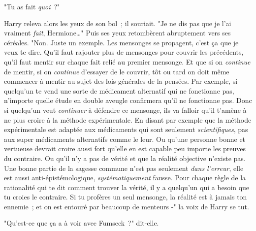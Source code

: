 "Tu as fait \emph{quoi}~?"

Harry releva alors les yeux de son bol~; il souriait. "Je ne dis pas que je l'ai vraiment \emph{fait}, Hermione…" Puis ses yeux retombèrent abruptement vers ses céréales. "Non. Juste un exemple. Les mensonges se propagent, c'est ça que je veux te dire. Qu'il faut rajouter plus de mensonges pour couvrir les précédents, qu'il faut mentir sur chaque fait relié au premier mensonge. Et que si on \emph{continue} de mentir, si on \emph{continue} d'essayer de le couvrir, tôt ou tard on doit même commencer à mentir au sujet des lois générales de la pensées. Par exemple, si quelqu'un te vend une sorte de médicament alternatif qui ne fonctionne pas, n'importe quelle étude en double aveugle confirmera qu'il ne fonctionne pas. Donc si quelqu'un veut \emph{continuer} à défendre ce mensonge, ils va falloir qu'il t'amène à ne plus croire à la méthode expérimentale. En disant par exemple que la méthode expérimentale est adaptée aux médicaments qui sont seulement \emph{scientifiques}, pas aux super médicaments alternatifs comme le leur. Ou qu'une personne bonne et vertueuse devrait croire aussi fort qu'elle en est capable peu importe les preuves du contraire. Ou qu'il n'y a pas de vérité et que la réalité objective n'existe pas. Une bonne partie de la sagesse commune n'est pas seulement \emph{dans l'erreur}, elle est aussi anti-épistémologique, \emph{systématiquement} fausse. Pour chaque règle de la rationalité qui te dit comment trouver la vérité, il y a quelqu'un qui a besoin que tu croies le contraire. Si tu profères un seul mensonge, la réalité est à jamais ton ennemie~; et on est entouré par beaucoup de menteurs -" la voix de Harry se tut.

"Qu'est-ce que ça a à voir avec Fumseck~?" dit-elle.

